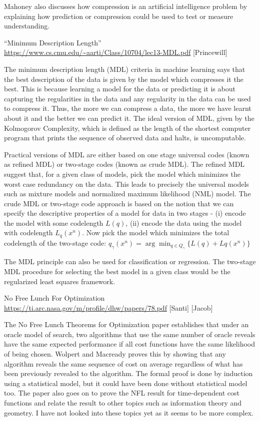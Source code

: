 \documentclass[12pt]{article}
\begin{document}
Mahoney also discusses how compression is an artificial intelligence problem by explaining how prediction or compression could be used to test or measure understanding.

``Minimum Description Length” \url{https://www.cs.cmu.edu/~aarti/Class/10704/lec13-MDL.pdf} [Princewill]

The minimum description length (MDL) criteria in machine learning says that the best description of the data is given by the model which compresses it the best. This is because learning a model for the data or predicting it is about capturing the regularities in the data and any regularity in the data can be used to compress it. Thus, the more we can compress a data, the more we have learnt about it and the better we can predict it. The ideal version of MDL, given by the Kolmogorov Complexity, which is defined as the length of the shortest computer program that prints the sequence of observed data and halts, is uncomputable.

Practical versions of MDL are either based on one stage universal codes (known as refined MDL) or two-stage codes (known as crude MDL). The refined MDL suggest that, for a given class of models, pick the model which minimizes the worst case redundancy on the data. This leads to precisely the universal models such as mixture models and normalized maximum likelihood (NML) model. The crude MDL or two-stage code approach is based on the notion that we can specify the descriptive properties of a model for data in two stages - (i) encode the model with some codelength $L(q)$, (ii) encode the data using the model with codelength $L_q(x^n)$. Now pick the model which minimizes the total codelength of the two-stage code: $q_\gamma(x^n) = \arg \min_{q\in Q_\gamma} \{L(q) + Lq(x^n)\}$

The MDL principle can also be used for classification or regression. The two-stage MDL procedure for selecting the best model in a given class would be the regularized least squares framework.

No Free Lunch For Optimization
\url{https://ti.arc.nasa.gov/m/profile/dhw/papers/78.pdf} [Santi] [Jacob]	

The No Free Lunch Theorems for Optimization paper establishes that under an oracle model of search, two algorithms that use the same number of oracle reveals have the same expected performance if all cost functions have the same likelihood of being chosen. Wolpert and Macready proves this by showing that any algorithm reveals the same sequence of cost on average regardless of what has been previously revealed to the algorithm. The formal proof is done by induction using a statistical model, but it could have been done without statistical model too. The paper also goes on to prove the NFL result for time-dependent cost functions and relate the result to other topics such as information theory and geometry. I have not looked into these topics yet as it seems to be more complex.
\end{document}
